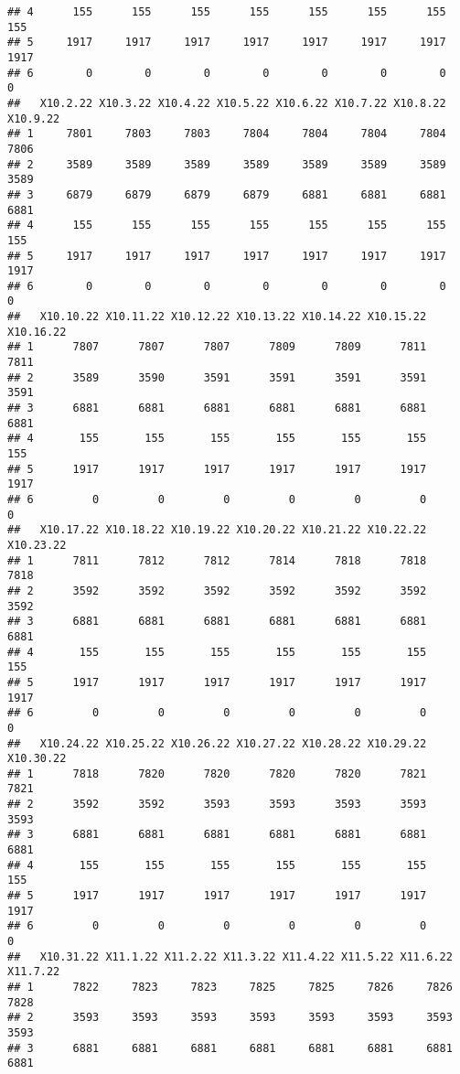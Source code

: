 \documentclass[
]{article}
\begin{document}
\begin{verbatim}
## 4      155      155      155      155      155      155      155      155
## 5     1917     1917     1917     1917     1917     1917     1917     1917
## 6        0        0        0        0        0        0        0        0
##   X10.2.22 X10.3.22 X10.4.22 X10.5.22 X10.6.22 X10.7.22 X10.8.22 X10.9.22
## 1     7801     7803     7803     7804     7804     7804     7804     7806
## 2     3589     3589     3589     3589     3589     3589     3589     3589
## 3     6879     6879     6879     6879     6881     6881     6881     6881
## 4      155      155      155      155      155      155      155      155
## 5     1917     1917     1917     1917     1917     1917     1917     1917
## 6        0        0        0        0        0        0        0        0
##   X10.10.22 X10.11.22 X10.12.22 X10.13.22 X10.14.22 X10.15.22 X10.16.22
## 1      7807      7807      7807      7809      7809      7811      7811
## 2      3589      3590      3591      3591      3591      3591      3591
## 3      6881      6881      6881      6881      6881      6881      6881
## 4       155       155       155       155       155       155       155
## 5      1917      1917      1917      1917      1917      1917      1917
## 6         0         0         0         0         0         0         0
##   X10.17.22 X10.18.22 X10.19.22 X10.20.22 X10.21.22 X10.22.22 X10.23.22
## 1      7811      7812      7812      7814      7818      7818      7818
## 2      3592      3592      3592      3592      3592      3592      3592
## 3      6881      6881      6881      6881      6881      6881      6881
## 4       155       155       155       155       155       155       155
## 5      1917      1917      1917      1917      1917      1917      1917
## 6         0         0         0         0         0         0         0
##   X10.24.22 X10.25.22 X10.26.22 X10.27.22 X10.28.22 X10.29.22 X10.30.22
## 1      7818      7820      7820      7820      7820      7821      7821
## 2      3592      3592      3593      3593      3593      3593      3593
## 3      6881      6881      6881      6881      6881      6881      6881
## 4       155       155       155       155       155       155       155
## 5      1917      1917      1917      1917      1917      1917      1917
## 6         0         0         0         0         0         0         0
##   X10.31.22 X11.1.22 X11.2.22 X11.3.22 X11.4.22 X11.5.22 X11.6.22 X11.7.22
## 1      7822     7823     7823     7825     7825     7826     7826     7828
## 2      3593     3593     3593     3593     3593     3593     3593     3593
## 3      6881     6881     6881     6881     6881     6881     6881     6881

\end{verbatim}
\end{document}
